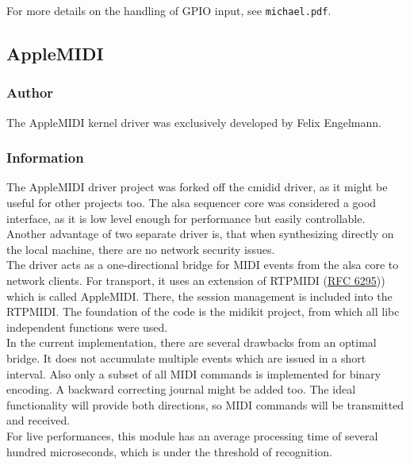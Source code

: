 \documentclass[paper=a4,fontsize=11pt,twocolumn,pagesize,bibtotoc]{scrartcl}
\begin{document}
For more details on the handling of GPIO input, see \texttt{michael.pdf}.

\subsection{AppleMIDI}
\label{overview:applemidi}

\subsubsection{Author}

The AppleMIDI kernel driver was exclusively developed by Felix Engelmann.

\subsubsection{Information}

The AppleMIDI driver project was forked off the cmidid driver, as it might be useful for other projects too. The alsa sequencer core was considered a good interface, as it is low level enough for performance but easily controllable. Another advantage of two separate driver is, that when synthesizing directly on the local machine, there are no network security issues.
\\
The driver acts as a one-directional bridge for MIDI events from the alsa core to network clients.
For transport, it uses an extension of RTPMIDI (\href{http://tools.ietf.org/html/rfc6295}{RFC 6295})) which is called AppleMIDI. There, the session management is included into the RTPMIDI.
The foundation of the code is the midikit project, from which all libc independent functions were used.
\\
In the current implementation, there are several drawbacks from an optimal bridge. It does not accumulate multiple events which are issued in a short interval. Also only a subset of all MIDI commands is implemented for binary encoding. A backward correcting journal might be added too. The ideal functionality will provide both directions, so MIDI commands will be transmitted and received.
\\
For live performances, this module has an average processing time of several hundred microseconds, which is under the threshold of recognition.
\end{document}

